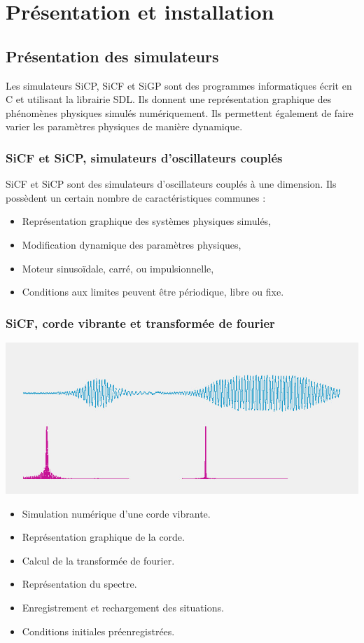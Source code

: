 \chapter{Présentation et installation}
%

\section{Présentation des simulateurs}
%
Les simulateurs SiCP, SiCF et SiGP sont des programmes informatiques écrit en C et utilisant la librairie SDL. Ils donnent une représentation graphique des phénomènes physiques simulés numériquement. Ils permettent également de faire varier les paramètres physiques de manière dynamique.
%
\subsection{SiCF et SiCP, simulateurs d'oscillateurs couplés}
%
SiCF et SiCP sont des simulateurs d'oscillateurs couplés à une dimension. Ils possèdent un certain nombre de caractéristiques communes : 

\begin{itemize}[leftmargin=1cm, label=, itemsep=0pt]
\item Représentation graphique des systèmes physiques simulés,
\item Modification dynamique des paramètres physiques,
\item Moteur sinusoïdale, carré, ou impulsionnelle,
\item Conditions aux limites peuvent être périodique, libre ou fixe.
\end{itemize}
%
\subsection{SiCF, corde vibrante et transformée de fourier}
%
\begin{center}
\includegraphics[scale=0.51]{./titre/heisenberg2}
\end{center}
%
\begin{itemize}[leftmargin=1cm, label=, itemsep=0pt]
\item Simulation numérique d'une corde vibrante.
\item Représentation graphique de la corde.
\item Calcul de la transformée de fourier.
\item Représentation du spectre.
\item Enregistrement et rechargement des situations.
\item Conditions initiales préenregistrées.
\end{itemize}
%

